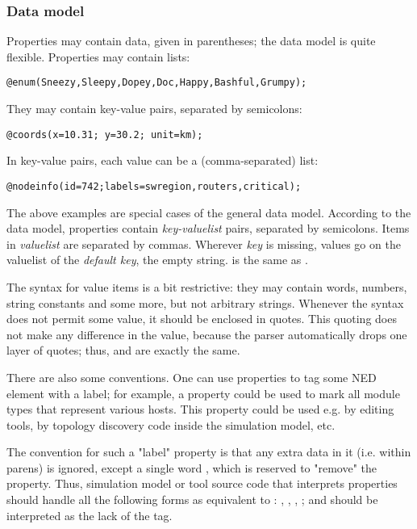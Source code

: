 \subsubsection{Data model}

Properties may contain data, given in parentheses; the data model is quite
flexible. Properties may contain lists:

\begin{Verbatim}
@enum(Sneezy,Sleepy,Dopey,Doc,Happy,Bashful,Grumpy);
\end{Verbatim}

They may contain key-value pairs, separated by semicolons:

\begin{Verbatim}
@coords(x=10.31; y=30.2; unit=km);
\end{Verbatim}

In key-value pairs, each value can be a (comma-separated) list:

\begin{Verbatim}
@nodeinfo(id=742;labels=swregion,routers,critical);
\end{Verbatim}

The above examples are special cases of the general data model. According
to the data model, properties contain \textit{key-valuelist} pairs,
separated by semicolons. Items in \textit{valuelist} are separated by
commas. Wherever \textit{key} is missing, values go on the valuelist of the
\textit{default key}, the empty string.  is the same
as .

The syntax for value items is a bit restrictive: they may contain words,
numbers, string constants and some more, but not arbitrary strings.
Whenever the syntax does not permit some value, it should be enclosed in
quotes. This quoting does not make any difference in the value, because
the parser automatically drops one layer of quotes; thus, 
and  are exactly the same.

There are also some conventions. One can use properties to tag some NED element
with a label; for example, a  property could be used to mark
all module types that represent various hosts. This property could be used
e.g. by editing tools, by topology discovery code inside the simulation model, etc.

The convention for such a "label" property is that any extra data in it
(i.e. within parens) is ignored, except a single word , which is
reserved to "remove" the property. Thus, simulation model or tool source
code that interprets properties should handle all the following forms as
equivalent to : , ,
, ; and
 should be interpreted as the lack of the 
tag.



